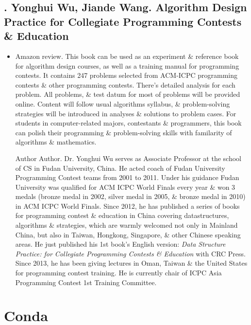 \documentclass{article}
\begin{document}

\subsection{\cite{Wu_Wang2019}. {\sc Yonghui Wu, Jiande Wang}. Algorithm Design Practice for Collegiate Programming Contests \& Education}

\begin{itemize}
	\item {\sf Amazon review.} This book can be used as an experiment \& reference book for algorithm design courses, as well as a training manual for programming contests. It contains 247 problems selected from ACM-ICPC programming contests \& other programming contests. There's detailed analysis for each problem. All problems, \& test datum for most of problems will be provided online. Content will follow usual algorithms syllabus, \& problem-solving strategies will be introduced in analyses \& solutions to problem cases. For students in computer-related majors, contestants \& programmers, this book can polish their programming \& problem-solving skills with familarity of algorithms \& mathematics.
	
	{\sf Author Author.} Dr. {\sc Yonghui Wu} serves as Associate Professor at the school of CS in Fudan University, China. He acted coach of Fudan University Programming Contest teams from 2001 to 2011. Under his guidance Fudan University was qualified for ACM ICPC World Finals every year \& won 3 medals (bronze medal in 2002, silver medal in 2005, \& bronze medal in 2010) in ACM ICPC World Finals. Since 2012, he has published a series of books for programming contest \& education in China covering datastructures, algorithms \& strategies, which are warmly welcomed not only in Mainland China, but also in Taiwan, Hongkong, Singapore, \& other Chinese speaking areas. He just published his 1st book's English version: {\it Data Structure Practice: for Collegiate Programming Contests \& Education} with CRC Press. Since 2013, he has been giving lectures in Oman, Taiwan \& the United States for programming contest training. He is currently chair of ICPC Asia Programming Contest 1st Training Committee.
\end{itemize}


\section{Conda}
\end{document}
